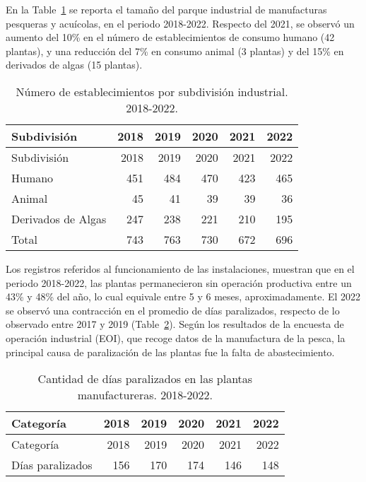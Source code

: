\documentclass[
  super,
  preprint,
  3p]{elsarticle}
\begin{document}
En la Table~\ref{tbl-c} se reporta el tamaño del parque industrial de
manufacturas pesqueras y acuícolas, en el periodo 2018-2022. Respecto
del 2021, se observó un aumento del 10\% en el número de
establecimientos de consumo humano (42 plantas), y una reducción del 7\%
en consumo animal (3 plantas) y del 15\% en derivados de algas (15
plantas).

\hypertarget{tbl-c}{}
\begin{longtable}[]{@{}lrrrrr@{}}
\caption{\label{tbl-c}Número de establecimientos por subdivisión
industrial. 2018-2022.}\tabularnewline
\toprule\noalign{}
Subdivisión & 2018 & 2019 & 2020 & 2021 & 2022 \\
\midrule\noalign{}
\endfirsthead
\toprule\noalign{}
Subdivisión & 2018 & 2019 & 2020 & 2021 & 2022 \\
\midrule\noalign{}
\endhead
\bottomrule\noalign{}
\endlastfoot
Humano & 451 & 484 & 470 & 423 & 465 \\
Animal & 45 & 41 & 39 & 39 & 36 \\
Derivados de Algas & 247 & 238 & 221 & 210 & 195 \\
Total & 743 & 763 & 730 & 672 & 696 \\
\end{longtable}

Los registros referidos al funcionamiento de las instalaciones, muestran
que en el periodo 2018-2022, las plantas permanecieron sin operación
productiva entre un 43\% y 48\% del año, lo cual equivale entre 5 y 6
meses, aproximadamente. El 2022 se observó una contracción en el
promedio de días paralizados, respecto de lo observado entre 2017 y 2019
(Table~\ref{tbl-d}). Según los resultados de la encuesta de operación
industrial (EOI), que recoge datos de la manufactura de la pesca, la
principal causa de paralización de las plantas fue la falta de
abastecimiento.

\hypertarget{tbl-d}{}
\begin{longtable}[]{@{}lrrrrr@{}}
\caption{\label{tbl-d}Cantidad de días paralizados en las plantas
manufactureras. 2018-2022.}\tabularnewline
\toprule\noalign{}
Categoría & 2018 & 2019 & 2020 & 2021 & 2022 \\
\midrule\noalign{}
\endfirsthead
\toprule\noalign{}
Categoría & 2018 & 2019 & 2020 & 2021 & 2022 \\
\midrule\noalign{}
\endhead
\bottomrule\noalign{}
\endlastfoot
Días paralizados & 156 & 170 & 174 & 146 & 148 \\
\end{longtable}


\renewcommand\refname{References}
  
\end{document}
